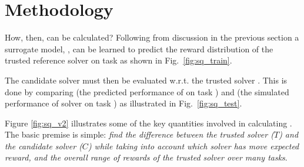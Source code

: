 \section{Methodology}
How, then, can \xQ{} be calculated? Following from discussion in the previous section a surrogate model, \surrogate{}, can be learned to predict the reward distribution \rwdstarapprox{} of the trusted reference solver \solvestar{} on task \task{} as shown in Fig.~\ref{fig:sq_train}.

The candidate solver \solve{} must then be evaluated w.r.t. the trusted solver \solvestar{}. This is done by comparing \rwdstarapprox{} (the predicted performance of \solvestar{} on task \task) and \rwd{} (the simulated performance of solver \solve{} on task \task) as illustrated in Fig.~\ref{fig:sq_test}.

Figure \ref{fig:sq_v2} illustrates some of the key quantities involved in calculating \xQ. The basic premise is simple: \emph{find the difference between the trusted solver ($T$) and the candidate solver ($C$) while taking into account which solver has move expected reward, and the overall range of rewards of the trusted solver over many tasks}.

